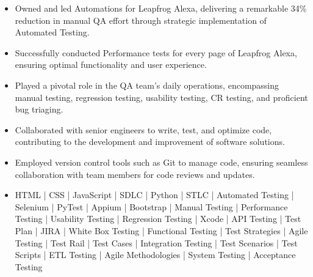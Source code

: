 



















\begin{itemize}
\item Owned and led Automations for Leapfrog Alexa, delivering a remarkable 34\% reduction in manual QA effort through strategic implementation of Automated Testing.
\item Successfully conducted Performance tests for every page of Leapfrog Alexa, ensuring optimal functionality and user experience.
\item Played a pivotal role in the QA team's daily operations, encompassing manual testing, regression testing, usability testing, CR testing, and proficient bug triaging.

\end{itemize}

\divider


\begin{itemize}
\item  Collaborated with senior engineers to write, test, and optimize code, contributing to the development and improvement of software solutions.
\item Employed version control tools such as Git to manage code, ensuring seamless collaboration with team members for code reviews and updates.
 \end{itemize}
\divider





\begin{itemize}
\item HTML | CSS | JavaScript | SDLC |  \smallskip Python | \smallskip  STLC | Automated Testing | Selenium | PyTest  | Appium | Bootstrap | Manual Testing |  \smallskip Performance Testing | Usability Testing |  \smallskip Regression Testing | Xcode | API Testing | \smallskip  Test Plan | \smallskip JIRA  | White Box Testing | Functional Testing | Test Strategies |  Agile Testing | Test Rail | Test Cases | \smallskip Integration Testing | Test Scenarios | Test Scripts |  \smallskip ETL Testing | Agile Methodologies |  \smallskip System Testing | Acceptance Testing
\end{itemize}


